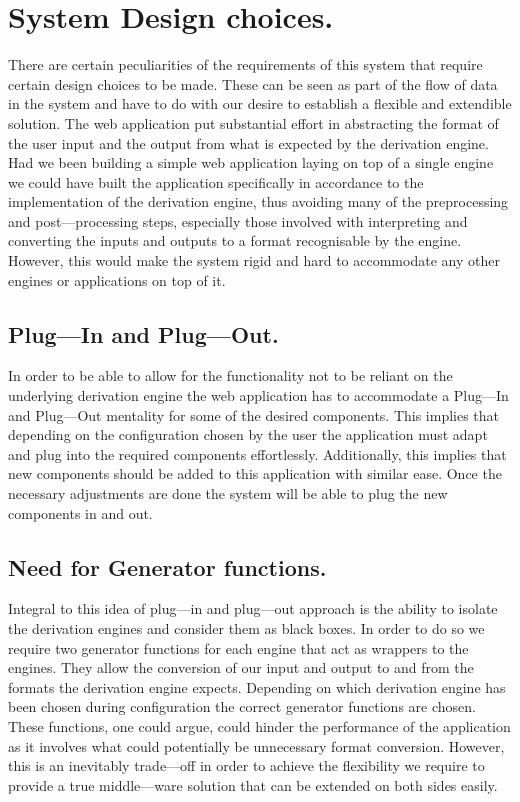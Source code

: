 \section{System Design choices.}
There are certain peculiarities of the requirements of this system that require certain design choices to be made. These can be seen as part of the flow of data in the system and have to do with our desire to establish a flexible and extendible solution. The web application put substantial effort in abstracting the format of the user input and the output from what is expected by the derivation engine. Had we been building a simple web application laying on top of a single engine we could have built the application specifically in accordance to the implementation of the derivation engine, thus avoiding many of the preprocessing and post---processing steps, especially those involved with interpreting and converting the inputs and outputs to a format recognisable by the engine. However, this would make the system rigid and hard to accommodate any other engines or applications on top of it.

\subsection{Plug---In and Plug---Out.}
In order to be able to allow for the functionality not to be reliant on the underlying derivation engine the web application has to accommodate a Plug---In and Plug---Out mentality for some of the desired components. This implies that depending on the configuration chosen by the user the application must adapt and plug into the required components effortlessly. Additionally, this implies that new components should be added to this application with similar ease. Once the necessary adjustments are done the system will be able to plug the new components in and out.

\subsection{Need for Generator functions.}
Integral to this idea of plug---in and plug---out approach is the ability to isolate the derivation engines and consider them as black boxes. In order to do so we require two generator functions for each engine that act as wrappers to the engines. They allow the conversion of our input and output to and from the formats the derivation engine expects. Depending on which derivation engine has been chosen during configuration the correct generator functions are chosen. These functions, one could argue, could hinder the performance of the application as it involves what could potentially be unnecessary format conversion. However, this is an inevitably trade---off in order to achieve the flexibility we require to provide a true middle---ware solution that can be extended on both sides easily.

